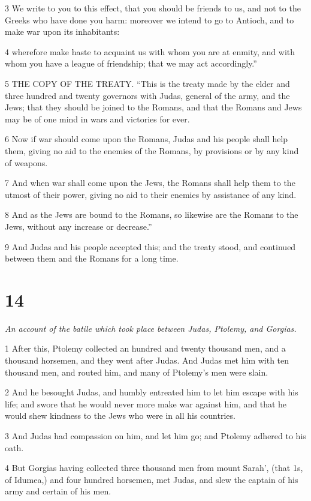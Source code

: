 3 We write to you to this effect, that you should be friends to us, and not to the Greeks who have done you harm: moreover we intend to go to Antioch, and to make war upon its inhabitants: 

4 wherefore make haste to acquaint us with whom you are at enmity, and with whom you have a league of friendship; that we may act accordingly.” 

5 THE COPY OF THE TREATY. “This is the treaty made by the elder and three hundred and twenty governors with Judas, general of the army, and the Jews; that they should be joined to the Romans, and that the Romans and Jews may be of one mind in wars and victories for ever.

6 Now if war should come upon the Romans, Judas and his people shall help them, giving no aid to the enemies of the Romans, by provisions or by any kind of weapons. 

7 And when war shall come upon the Jews, the Romans shall help them to the utmost of their power, giving no aid to their enemies by assistance of any kind. 

8 And as the Jews are bound to the Romans, so likewise are the Romans to the Jews, without any increase or decrease.” 

9 And Judas and his people accepted this; and the treaty stood, and continued between them and the Romans for a long time. 

\chapter{14}

\par \textit{An account of the batile which took place between Judas, Ptolemy, and Gorgias.}

1 After this, Ptolemy collected an hundred and twenty thousand men, and a thousand horsemen, and they went after Judas. And Judas met him with ten thousand men, and routed him, and many of Ptolemy’s men were slain. 

2 And he besought Judas, and humbly entreated him to let him escape with his life; and swore that he would never more make war against him, and that he would shew kindness to the Jews who were in all his countries. 

3 And Judas had compassion on him, and let him go; and Ptolemy adhered to his oath. 

4 But Gorgias having collected three thousand men from mount Sarah’, (that 1s, of Idumea,) and four hundred horsemen, met Judas, and slew the captain of his army and certain of his men. 

